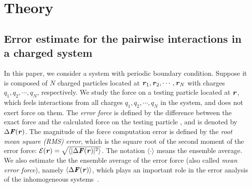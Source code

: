 \documentclass[journal=jacsat,manuscript=article]{achemso}
\newcommand{\recheck}[1]{{\color{black} #1}}
\newcommand{\redc}[1]{{\color{black} #1}}
\renewcommand{\v}[1]{\textbf{\textit{#1}}}
\begin{document}




\section{Theory}

\subsection{Error estimate for
  the pairwise interactions in a charged system}

In this paper, we consider a system with periodic boundary condition.
Suppose it is
composed \redc{of} $N$ charged particles located at $\v r_1, \v r_2, \cdots,
\v r_N$ with charges $q_1, q_2, \cdots, q_N$, respectively.
We study the force \redc{on} a testing particle located at $\v r$, which
feels interactions from all charges $q_1, q_2, \cdots, q_N$
in the system, and does not
exert force on them.
The \emph{error force} is defined by the difference between
the exact force and the calculated
force on the testing particle
\cite{wang2012}, and is denoted by $\Delta \v F(\v r)$.
The magnitude of the force computation error 
is defined by the \emph{root mean square (RMS)} \emph{error}, which is
the square root of the second moment of the error force: $\mathcal
E(\v r) = \sqrt{\langle\vert\Delta\v F(\v r)\vert^2\rangle}$.  The
notation $\langle\cdot\rangle$ means the ensemble average.  We also
estimate the the ensemble average of the error force (also called
\emph{mean error force}), namely $\langle\Delta\v F(\v r)\rangle$,
which plays an important role in the error analysis of the
inhomogeneous systems~\cite{wang2012}.
\end{document}
